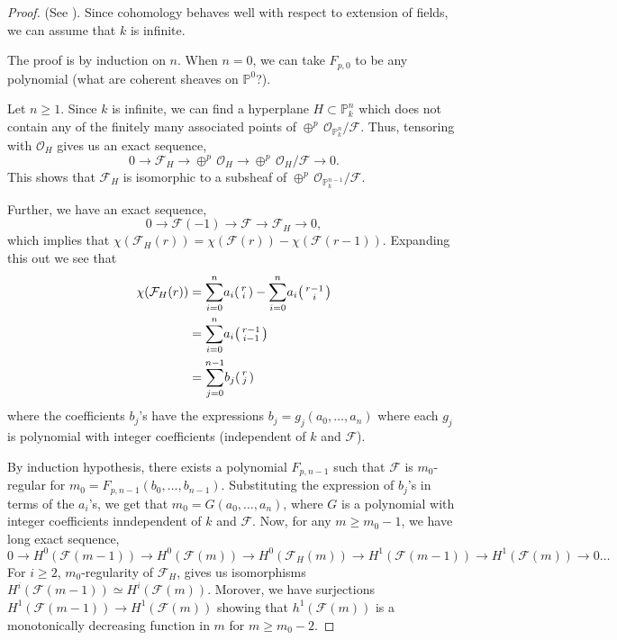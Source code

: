 \documentclass[ignorenonframetext,t]{beamer}
\newcommand{\sF}{{\mathcal F}}
\newcommand{\sO}{{\mathcal O}}
\renewcommand{\P}{{\mathbb P}}
\theoremstyle{definition}
\begin{document}
\begin{proof}(See \cite[Theorem 5.3]{FGAExplained}).
	Since cohomology behaves well with respect to extension of fields, we can assume that $k$ is infinite.
	
	The proof is by induction on $n$. When $n=0$, we can take $F_{p,0}$ to be any polynomial (what are coherent sheaves on $\P^0$?).
	
	Let $n\geq 1$. Since $k$ is infinite, we can find a hyperplane $H\subset \P^n_k$ which does not contain any of the finitely many associated points of $\oplus^p\,\sO_{\P^n_k}/\sF$. Thus, tensoring with $\sO_H$ gives us an exact sequence,
	\[0\rightarrow \sF_H \rightarrow \oplus^p\,\sO_H \rightarrow \oplus^p\,\sO_H/\sF \rightarrow 0.\]
	This shows that $\sF_H$ is isomorphic to a subsheaf of $\oplus^p\,\sO_{\P^{n-1}_k}/\sF$.
	
	Further, we have an exact sequence,
	\[0 \rightarrow \sF(-1)\rightarrow \sF \rightarrow \sF_H \rightarrow 0,\]
	which implies that $\chi(\sF_H(r))=\chi(\sF(r))-\chi(\sF(r-1))$. Expanding this out we see that
	\begin{align*}
	\chi(\sF_H(r))
	&=\overset{n}{\underset{i=0}{\sum}} a_i 
	\begin{psmallmatrix}
	r\\
	i	
	\end{psmallmatrix} -
	\overset{n}{\underset{i=0}{\sum}} a_i 
	\begin{psmallmatrix}
	r-1\\
	i	
	\end{psmallmatrix}\\
	&=\overset{n}{\underset{i=0}{\sum}} a_i 
	\begin{psmallmatrix}
	r-1\\
	i-1	
	\end{psmallmatrix}\\
	&=\overset{n-1}{\underset{j=0}{\sum}} b_j 
	\begin{psmallmatrix}
	r\\
	j	
	\end{psmallmatrix}
	\end{align*}
	where the coefficients $b_j$'s have the expressions $b_j=g_j(a_0,\ldots,a_n)$ where each $g_j$ is polynomial with integer coefficients (independent of $k$ and $\sF$).
	
	By induction hypothesis, there exists a polynomial $F_{p,n-1}$ such that $\sF$ is $m_0$-regular for $m_0=F_{p,n-1}(b_0,\ldots,b_{n-1})$. Substituting the expression of $b_j$'s in terms of the $a_i$'s, we get that $m_0=G(a_0,\ldots,a_n)$, where $G$ is a polynomial with integer coefficients inndependent of $k$ and $\sF$. Now, for any $m\geq m_0-1$, we have long exact sequence,
	\[0\rightarrow H^0(\sF(m-1))\rightarrow H^0(\sF(m))\rightarrow H^0(\sF_H(m))\rightarrow H^1(\sF(m-1))\rightarrow H^1(\sF(m)) \rightarrow 0 \ldots\]
	For $i\geq 2$, $m_0$-regularity of $\sF_H$, gives us isomorphisms $H^i(\sF(m-1))\simeq H^i(\sF(m))$. Morover, we have surjections $H^1(\sF(m-1))\rightarrow H^1(\sF(m))$ showing that $h^1(\sF(m))$ is a monotonically decreasing function in $m$ for $m\geq m_0 -2$.
	

\end{proof}
\end{document}

